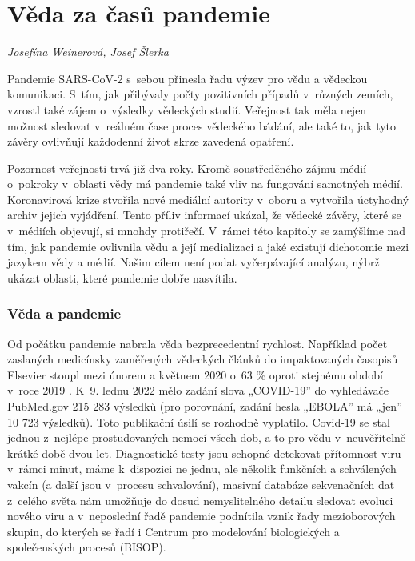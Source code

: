 \chapter{V\v{e}da za \v{c}as\r{u} pandemie}
\label{Veda_pandemie}

\textit{Josefína Weinerová, Josef Šlerka}

\vspace{15mm}


Pandemie SARS-CoV-2 s~sebou přinesla řadu výzev pro vědu a vědeckou komunikaci. S~tím, jak přibývaly počty pozitivních případů v~různých zemích, vzrostl také zájem o~výsledky vědeckých studií. Veřejnost tak měla nejen možnost sledovat v~reálném čase proces vědeckého bádání, ale také to, jak tyto závěry ovlivňují každodenní život skrze zavedená opatření.

Pozornost veřejnosti trvá již dva roky. Kromě soustředěného zájmu médií o~pokroky v~oblasti vědy má pandemie také vliv na fungování samotných médií. Koronavirová krize stvořila nové mediální autority v~oboru a vytvořila úctyhodný archiv jejich vyjádření. Tento příliv informací ukázal, že vědecké závěry, které se v~médiích objevují, si mnohdy protiřečí. V~rámci této kapitoly se zamýšlíme nad tím, jak pandemie ovlivnila vědu a její medializaci a jaké existují dichotomie mezi jazykem vědy a médií. Našim cílem není podat vyčerpávající analýzu, nýbrž ukázat oblasti, které pandemie dobře nasvítila.

\subsection*{Věda a pandemie}

Od počátku pandemie nabrala věda bezprecedentní rychlost. Například počet zaslaných medicínsky zaměřených vědeckých článků do impaktovaných časopisů Elsevier stoupl mezi únorem a květnem 2020 o~63 \% oproti stejnému období v~roce 2019 \cite{Squazzoni2021}. K~9. lednu 2022 mělo zadání slova „COVID-19” do vyhledávače PubMed.gov 215 283 výsledků (pro porovnání, zadání hesla „EBOLA” má „jen” 10 723 výsledků).
Toto publikační úsilí se rozhodně vyplatilo. Covid-19 se stal jednou z~nejlépe prostudovaných nemocí všech dob, a to pro vědu v~neuvěřitelně krátké době dvou let. Diagnostické testy jsou schopné detekovat přítomnost viru v~rámci minut, máme k~dispozici ne jednu, ale několik funkčních a schválených vakcín (a další jsou v~procesu schvalování), masivní databáze sekvenačních dat z~celého světa nám umožňuje do dosud nemyslitelného detailu sledovat evoluci nového viru \cite{Maxmen2021} a v~neposlední řadě pandemie podnítila vznik řady mezioborových skupin, do kterých se řadí i Centrum pro modelování biologických a společenských procesů (BISOP).

